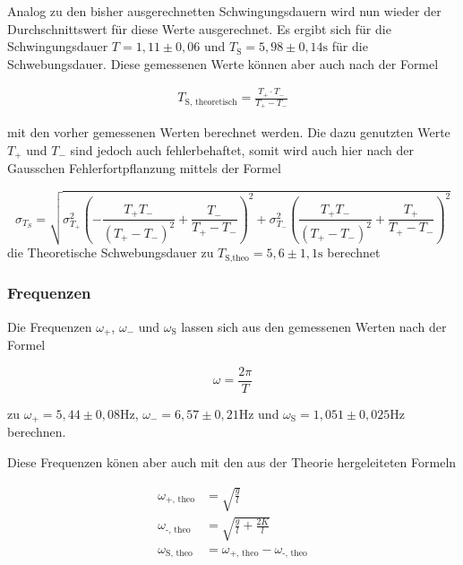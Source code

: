             \noindent Analog zu den bisher ausgerechnetten Schwingungsdauern wird nun wieder der Durchschnittswert für diese Werte ausgerechnet.
            Es ergibt sich für die Schwingungsdauer $T = 1,11 \pm 0,06 $ und $T_{\text{S}} = 5,98 \pm 0,14 \si{\second}$ für die Schwebungsdauer.
            Diese gemessenen Werte können aber auch nach der Formel 

            \begin{align*}
                T_\text{S, theoretisch} = \frac{T_{+} \cdot T_{-}}{T_{+} - T_{-}}
            \end{align*}

            \noindent mit den vorher gemessenen Werten berechnet werden. Die dazu genutzten Werte $T_+$ und $T_-$ sind jedoch auch fehlerbehaftet, 
            somit wird auch hier nach der Gausschen Fehlerfortpflanzung mittels der Formel 

            \begin{equation*}
                \sigma_{T_S} = \sqrt{\sigma_{T_{+}}^{2} \left(- \frac{T_{+} T_{-}}{\left(T_{+} - T_{-}\right)^{2}} + \frac{T_{-}}{T_{+} - T_{-}}\right)^{2} + \sigma_{T_{-}}^{2} \left(\frac{T_{+} T_{-}}{\left(T_{+} - T_{-}\right)^{2}} + \frac{T_{+}}{T_{+} - T_{-}}\right)^{2}}
            \end{equation*}
            die Theoretische Schwebungsdauer zu $T_{\text{S,theo}} = 5,6 \pm 1,1 \si{\second}$ berechnet
            \noindent 

        \subsubsection{Frequenzen}

            \noindent Die Frequenzen $\omega_{+}$, $\omega_{-}$ und $\omega_{\text{S}}$ lassen sich aus den gemessenen Werten nach der Formel 

            \begin{equation*}
                \omega = \frac{2 \pi}{T}
            \end{equation*}

            \noindent zu $\omega_{+} = 5,44 \pm 0,08 \si{\hertz}$, $\omega_{-} = 6,57 \pm 0,21 \si{\hertz}$ und 
            $ \omega_{\text{S}}= 1,051 \pm 0,025 \si{\hertz}$ berechnen.

            \noindent Diese Frequenzen könen aber auch mit den aus der Theorie hergeleiteten Formeln 

            \begin{align*}
            \omega_\text{+, theo} &= \sqrt{\frac{g}{l}}\\
            \omega_\text{-, theo} &= \sqrt{\frac{g}{l} + \frac{2 K}{l}}\\
            \omega_\text{S, theo} &= \omega_\text{+, theo} - \omega_\text{-, theo}
            \end{align*}

